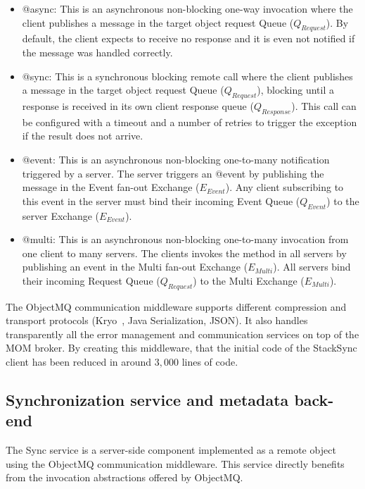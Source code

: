 \begin{itemize}

\item @async:  This is an asynchronous non-blocking  one-way invocation where the client  publishes a message in the target object request 
Queue ($Q_{Request}$). By default, the client expects to receive no response and it is even not notified if the message was handled correctly.


\item @sync:  This is a synchronous blocking remote call where the client publishes a message in the target object
request Queue ($Q_{Request}$), blocking until a response is received in its own client response queue ($Q_{Response}$).  
This call can be configured with a timeout and a number of retries to trigger the exception if the result does not arrive.

\item @event:  This is an asynchronous non-blocking one-to-many notification triggered by a server.  The server triggers an @event by publishing the message in  the Event  fan-out Exchange ($E_{Event}$). Any client subscribing to this event in the server must bind their incoming Event Queue ($Q_{Event}$) to the server Exchange ($E_{Event}$).

\item @multi: This is an asynchronous non-blocking one-to-many invocation from one client to many servers. The clients invokes the method in all servers by publishing an event in the Multi  fan-out Exchange ($E_{Multi}$). All servers bind their incoming Request Queue ($Q_{Request}$) to the Multi Exchange ($E_{Multi}$).
   
\end{itemize}

The ObjectMQ communication middleware supports different compression and transport protocols (Kryo~\cite{kryo}, Java Serialization, JSON). It also handles transparently all the error management and communication services on top of the MOM broker. By creating this middleware, that the initial code of the StackSync client has been reduced in around $3,000$ lines of code.


\subsection{Synchronization service and metadata back-end}

The Sync service is a server-side component implemented as a remote object using the ObjectMQ communication middleware. This service directly benefits from the invocation abstractions offered by ObjectMQ. 

